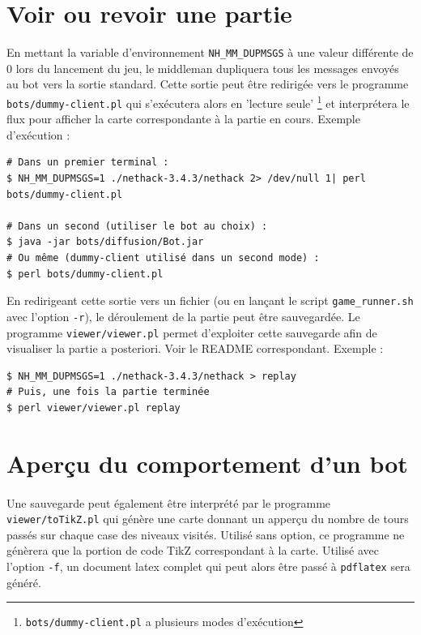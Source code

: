 \documentclass[10pt,a4paper]{report}
\begin{document}
\section{Voir ou revoir une partie}

En mettant la variable d'environnement \verb!NH_MM_DUPMSGS! à une valeur
différente de 0 lors du lancement du jeu, le middleman dupliquera tous les
messages envoyés au bot vers la sortie standard. Cette sortie peut être
redirigée vers le programme \verb!bots/dummy-client.pl! qui s'exécutera alors en
'lecture seule' \footnote{\verb!bots/dummy-client.pl! a plusieurs modes
d'exécution} et interprétera le flux pour afficher la carte correspondante à
la partie en cours. Exemple d'exécution :

\begin{verbatim}
# Dans un premier terminal :
$ NH_MM_DUPMSGS=1 ./nethack-3.4.3/nethack 2> /dev/null 1| perl bots/dummy-client.pl

# Dans un second (utiliser le bot au choix) :
$ java -jar bots/diffusion/Bot.jar
# Ou même (dummy-client utilisé dans un second mode) :
$ perl bots/dummy-client.pl
\end{verbatim}


En redirigeant cette sortie vers un fichier (ou en lançant le script
\verb!game_runner.sh! avec l'option \verb!-r!), le déroulement de la partie peut
être sauvegardée.  Le programme \verb!viewer/viewer.pl! permet d'exploiter
cette sauvegarde afin de visualiser la partie a posteriori. Voir le README
correspondant. Exemple :

\begin{verbatim}
$ NH_MM_DUPMSGS=1 ./nethack-3.4.3/nethack > replay
# Puis, une fois la partie terminée
$ perl viewer/viewer.pl replay
\end{verbatim}


\section{Aperçu du comportement d'un bot}

\paragraph{}
Une sauvegarde peut également être interprété par le
programme \verb!viewer/toTikZ.pl! qui génère une carte donnant un apperçu du
nombre de tours passés sur chaque case des niveaux visités. Utilisé sans
option, ce programme ne génèrera que la portion de code TikZ correspondant à
la carte. Utilisé avec l'option \verb!-f!, un document latex complet qui peut
alors être passé à \verb!pdflatex! sera généré.
\end{document}
